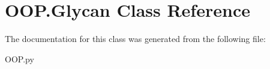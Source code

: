 \hypertarget{class_o_o_p_1_1_glycan}{}\section{O\+O\+P.\+Glycan Class Reference}
\label{class_o_o_p_1_1_glycan}


The documentation for this class was generated from the following file\+:\begin{DoxyCompactItemize}
\item 
O\+O\+P.\+py\end{DoxyCompactItemize}
